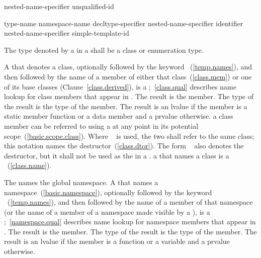 %
%
%
\begin{bnf}
\br
    nested-name-specifier \opt unqualified-id
\end{bnf}

%
%
%
\begin{bnf}
\br
    \terminal{::}\br
    type-name \terminal{::}\br
    namespace-name \terminal{::}\br
    decltype-specifier \terminal{::}\br
    nested-name-specifier identifier \terminal{::}\br
    nested-name-specifier \opt simple-template-id \terminal{::}
\end{bnf}

The type denoted by a  in a
 shall be a class or enumeration
type.

\pnum
A  that denotes a class, optionally
followed by the keyword ~(\ref{temp.names}), and then
followed by the name of a member of either that class~(\ref{class.mem})
or one of its base classes (Clause~\ref{class.derived}), is a
%
;~\ref{class.qual} describes name lookup for
class members that appear in . The result is the
member. The type of the result is the type of the member. The result is
an lvalue if the member is a static member function or a data member and a
prvalue otherwise.
\enternote 
a class member can be referred to using a  at any
point in its potential scope~(\ref{basic.scope.class}).
\exitnote 
Where
 \tcode{::\tilde}~ is used,
the two  shall refer to the same class; this
notation names the destructor~(\ref{class.dtor}).
The form \tcode{\tilde}~ also denotes the destructor,
but it shall not be used as the  in a .
\enternote 
a  that names a class is a
~(\ref{class.name}).
\exitnote 

\pnum
The  \tcode{::} names the global namespace.
A  that names a
namespace~(\ref{basic.namespace}), optionally followed by the keyword
~(\ref{temp.names}), and then followed by the name of a member
of that namespace (or the name of a member of a namespace made visible by a
), is a
%
;~\ref{namespace.qual} describes name lookup for
namespace members that appear in . The result is
the member. The type of the result is the type of the member. The result
is an lvalue if the member is a function or a variable and a prvalue otherwise.

